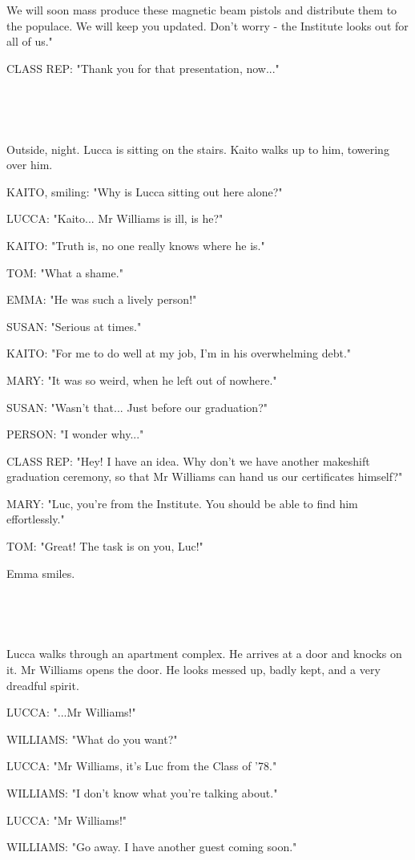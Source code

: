 \documentclass[11pt]{article}
\begin{document}
We will soon mass produce these magnetic beam pistols and distribute them to the populace. 
We will keep you updated. 
Don't worry - the Institute looks out for all of us."

CLASS REP: "Thank you for that presentation, now..."

\ 

\ 

Outside, night.
Lucca is sitting on the stairs.
Kaito walks up to him, towering over him.

KAITO, smiling: "Why is Lucca sitting out here alone?"

LUCCA: "Kaito...
Mr Williams is ill, is he?"

KAITO: "Truth is, no one really knows where he is."

TOM: "What a shame."

EMMA: "He was such a lively person!"

SUSAN: "Serious at times."

KAITO: "For me to do well at my job, I'm in his overwhelming debt."

MARY: "It was so weird, when he left out of nowhere."

SUSAN: "Wasn't that... Just before our graduation?"

PERSON: "I wonder why..."

CLASS REP: "Hey! I have an idea. 
Why don't we have another makeshift graduation ceremony, so that Mr Williams can hand us our certificates himself?"

MARY: "Luc, you're from the Institute. 
You should be able to find him effortlessly."

TOM: "Great! The task is on you, Luc!"

Emma smiles.

\ 

\ 

Lucca walks through an apartment complex. 
He arrives at a door and knocks on it.
Mr Williams opens the door. 
He looks messed up, badly kept, and a very dreadful spirit.

LUCCA: "...Mr Williams!"

WILLIAMS: "What do you want?"

LUCCA: "Mr Williams, it's Luc from the Class of '78."

WILLIAMS: "I don't know what you're talking about."

LUCCA: "Mr Williams!"

WILLIAMS: "Go away. I have another guest coming soon."
\end{document}
